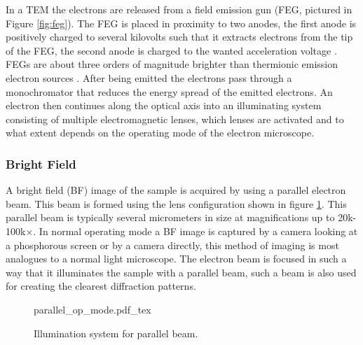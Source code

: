 In a TEM the electrons are released from a field emission gun (FEG, pictured in Figure \ref{fig:feg}). 
The FEG is placed in proximity to two anodes, the first anode is positively charged to several kilovolts such that it extracts electrons from the tip of the FEG, the second anode is charged to the wanted acceleration voltage \cite{Williams2009-ww}.
FEGs are about three orders of magnitude brighter than thermionic emission electron sources \cite{field-emission}.
After being emitted the electrons pass through a monochromator that reduces the energy spread of the emitted electrons. An electron then continues along the optical axis into an illuminating system consisting of multiple electromagnetic lenses, which lenses are activated and to what extent depends on the operating mode of the electron microscope.

\subsubsection{Bright Field}
A bright field (BF) image of the sample is acquired by using a parallel electron beam. This beam is formed using the lens configuration shown in figure \ref{fig:tem_operating}. This parallel beam is typically several micrometers in size at magnifications up to 20k-100k$\times$.
In normal operating mode a BF image is captured by a camera looking at a phosphorous screen or by a camera directly, this method of imaging is most analogues to a normal light microscope.
The electron beam is focused in such a way that it illuminates the sample with a parallel beam, such a beam is also used for creating the clearest diffraction patterns.
\begin{figure}[h]
    \centering
    \def\svgwidth{.66\linewidth}
    {parallel_op_mode.pdf_tex}
    \caption{Illumination system for parallel beam.}
    \label{fig:tem_operating}
\end{figure}
